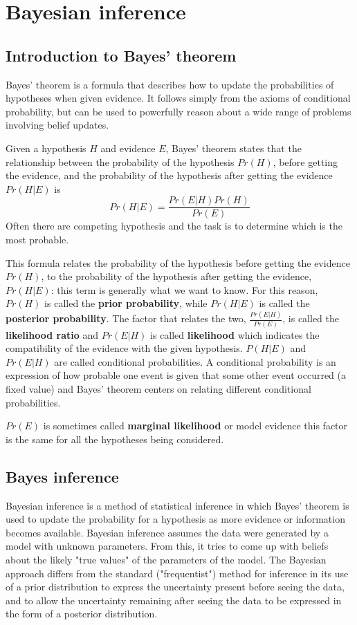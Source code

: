 
\section{Bayesian inference}

\subsection{Introduction to Bayes' theorem}
Bayes' theorem is a formula that describes how to update the probabilities of hypotheses when given evidence. It follows simply from the axioms of conditional probability, but can be used to powerfully reason about a wide range of problems involving belief updates.

Given a hypothesis $H$ and evidence $E$, Bayes' theorem states that the relationship between the probability of the hypothesis $Pr(H)$, before getting the evidence, and the probability of the hypothesis after getting the evidence $Pr(H|E)$ is
\begin{equation}
Pr(H|E) = \frac{Pr(E|H)Pr(H)}{Pr(E)}
\end{equation}
Often there are competing hypothesis and the task is to determine which is the most probable.

This formula relates the probability of the hypothesis before getting the evidence $Pr(H)$, to the probability of the hypothesis after getting the evidence, $Pr(H|E)$: this term is generally what we want to know. For this reason, $Pr(H)$ is called the \textbf{prior probability}, while 
$Pr(H|E)$ is called the \textbf{posterior probability}. The factor that relates the two, $\frac{Pr(E|H)}{Pr(E)}$, is called the \textbf{likelihood ratio} and $Pr(E|H)$ is called \textbf{likelihood} which indicates the compatibility of the evidence with the given hypothesis.
$P(H|E)$ and $Pr(E|H)$ are called conditional probabilities. A conditional probability is an expression of how probable one event is given that some other event occurred (a fixed value) and Bayes' theorem centers on relating different conditional probabilities.

$Pr(E)$ is sometimes called \textbf{marginal likelihood} or model evidence this factor is the same for all the hypotheses being considered.

\subsection{Bayes inference}
Bayesian inference is a method of statistical inference in which Bayes' theorem is used to update the probability for a hypothesis as more evidence or information becomes available. Bayesian inference assumes the data were generated by a model with unknown parameters. From this, it tries to come up with beliefs about the likely  "true values" of the parameters of the model. The Bayesian approach differs from the standard ("frequentist") method for inference in its use of a prior distribution to express the uncertainty present before seeing the data, and to allow the uncertainty remaining after seeing the data to be expressed in the form of a posterior distribution.

